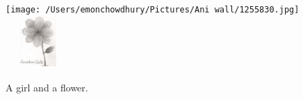 \documentclass[a4paper]{article}
\begin{document}
\begin{figure}[!hbt]
    \centering
    \texttt{[image: /Users/emonchowdhury/Pictures/Ani wall/1255830.jpg]}\hfill
    \includegraphics[width=2.5cm, height = 2.0cm]{flower}
    \caption{A girl and a flower.}
    \label{girl_flower}
    \end{figure}
\end{document}
